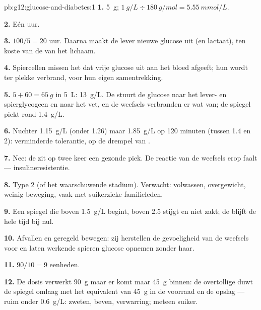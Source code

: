 \begin{solution}{pb:g12:glucose-and-diabetes:1}
\textbf{1.} \qty{5}{g}; $\qty{1}{g/L} \div \qty{180}{g/mol} = \qty{5.55}{mmol/L}$.

\textbf{2.} Eén uur.

\textbf{3.} $100/5 = 20$ uur. Daarna maakt de lever nieuwe glucose uit
 (en lactaat), ten koste van de  van het lichaam.

\textbf{4.} Spiercellen missen het  dat vrije glucose uit 
aan het bloed afgeeft; hun  wordt ter plekke verbrand, voor hun
eigen samentrekking.

\textbf{5.} $5 + 60 = \qty{65}{g}$ in \qty{5}{L}: \qty{13}{g/L}. De
 stuurt de glucose naar het lever- en spierglycogeen en naar het
vet, en de weefsels verbranden er wat van; de spiegel piekt rond \qty{1.4}{g/L}.

\textbf{6.} Nuchter \qty{1.15}{g/L} (onder 1.26) maar \qty{1.85}{g/L} op
120 minuten (tussen 1.4 en 2): verminderde tolerantie, op de drempel van
.

\textbf{7.} Nee: de  zit op twee keer een gezonde piek. De reactie
van de weefsels erop faalt --- insulineresistentie.

\textbf{8.} Type 2 (of het waarschuwende stadium). Verwacht: volwassen,
overgewicht, weinig beweging, vaak met suikerzieke familieleden.

\textbf{9.} Een spiegel die boven \qty{1.5}{g/L} begint, boven \num{2.5}
stijgt en niet zakt; de  blijft de hele tijd bij nul.

\textbf{10.} Afvallen en geregeld bewegen: zij herstellen de gevoeligheid
van de weefsels voor  en laten werkende spieren glucose opnemen
zonder haar.

\textbf{11.} $90/10 = 9$ eenheden.

\textbf{12.} De dosis verwerkt \qty{90}{g} maar er komt maar \qty{45}{g}
binnen: de overtollige  duwt de spiegel omlaag met het equivalent
van \qty{45}{g} in de voorraad en de opslag --- ruim onder \qty{0.6}{g/L}:
zweten, beven, verwarring; meteen suiker.


\end{solution}
